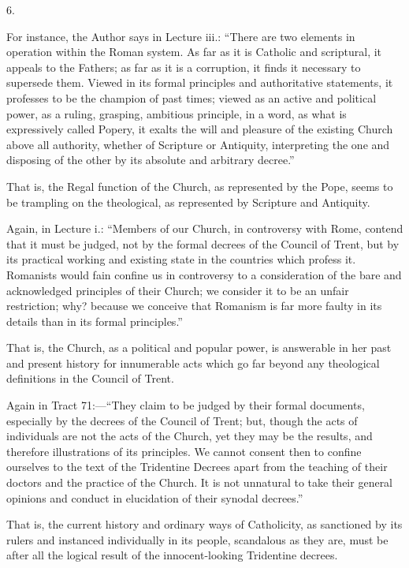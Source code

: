 6.

For instance, the Author says in Lecture iii.: ``There are two elements in operation within the Roman system. As far as it is
Catholic and scriptural, it appeals to the Fathers; as far as it is a
corruption, it finds it necessary to supersede them. Viewed in its
formal principles and authoritative statements, it professes to be the
champion of past times; viewed as an active and political power, as a
ruling, grasping, ambitious principle, in a word, as what is
expressively called Popery, it exalts the will and pleasure of the
existing Church above all authority, whether of Scripture or
Antiquity, interpreting the one and disposing of the other by its
absolute and arbitrary decree.''

That is, the Regal function of the Church, as represented by the
Pope, seems to be trampling on the theological, as represented by
Scripture and Antiquity.

Again, in Lecture i.: ``Members of our Church, in controversy
with Rome, contend that it must be judged, not by the formal decrees
of the Council of Trent, but by its practical working and existing
state in the countries which profess it. Romanists would fain confine
us in controversy to a consideration of the bare and acknowledged
principles of their Church; we consider it to be an unfair
restriction; why? because we conceive that Romanism is far more faulty
in its details than in its formal principles.''

That is, the Church, as a political and popular power, is
answerable in her past and present history for innumerable acts which
go far beyond any theological definitions in the Council of Trent.

Again in Tract 71:—``They claim to be judged by their formal
documents, especially by the decrees of the Council of Trent; but,
though the acts of individuals are not the acts of the Church, yet
they may be the results, and therefore illustrations of its
principles. We cannot consent then to confine ourselves to the text of
the Tridentine Decrees apart from the teaching of their doctors and
the practice of the Church. It is not unnatural to take their general
opinions and conduct in elucidation of their synodal decrees.''

That is, the current history and ordinary ways of Catholicity, as
sanctioned by its rulers and instanced individually in its people,
scandalous as they are, must be after all the logical result of the
innocent-looking Tridentine decrees.

